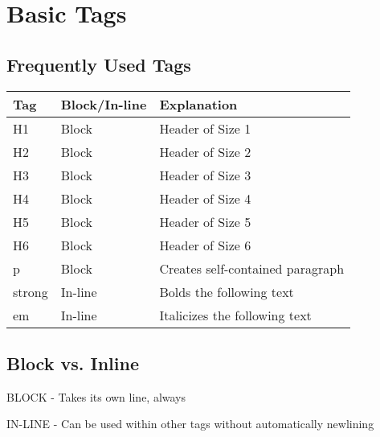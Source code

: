 \documentclass{article}
\begin{document}
\section{Basic Tags}
\subsection{Frequently Used Tags}
\begin{center}
	\begin{tabular}{| l | l | p{10cm} |}
		\hline
		\textbf{Tag} & \textbf{Block/In-line} & \textbf{Explanation} \\ \hline
		H1 & Block & Header of Size 1 \\ \hline
		H2 & Block & Header of Size 2 \\ \hline
		H3 & Block & Header of Size 3 \\ \hline
		H4 & Block & Header of Size 4 \\ \hline
		H5 & Block & Header of Size 5 \\ \hline
		H6 & Block & Header of Size 6 \\ \hline
		p & Block & Creates self-contained paragraph \\ \hline
		strong & In-line & Bolds the following text \\ \hline
		em & In-line & Italicizes the following text \\ \hline
	\end{tabular}
\end{center}

\subsection{Block vs. Inline}
\begin{center}
BLOCK - Takes its own line, always

IN-LINE - Can be used within other tags without automatically newlining
\end{center}
\end{document}

